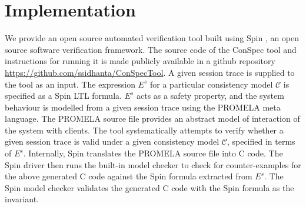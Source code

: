 \documentclass[acmlarge, ,11pt]{acmart}
\begin{document}


   \section{Implementation}\label{sec:impl}
 We provide an open source automated verification tool built using Spin \cite{Holzmann:2003:SMC:1405716}, an open source software verification framework. The source code of the ConSpec tool and instructions for running it is made publicly available in a github repository \url{https://github.com/ssidhanta/ConSpecTool}. A given session trace is supplied to the tool as an input. The expression  $E^s$ for a particular consistency model $\mathcal{C}$ is specified as a Spin LTL formula.  $E^s$ acts as a safety property, and the system behaviour is modelled from a given session trace using the PROMELA meta language. The PROMELA source file provides an abstract model of interaction of the system with clients. The tool systematically attempts to  verify whether a given session trace is valid under a given consistency model $\mathcal{C}$, specified in terms of  $E^s$.
  Internally, Spin translates the PROMELA source file into C code. The Spin driver then runs the built-in model checker to check for counter-examples for the above generated C code  against  the Spin formula extracted from $E^s$.  The Spin model checker validates the generated C code with the Spin formula as the invariant. %
\end{document}
